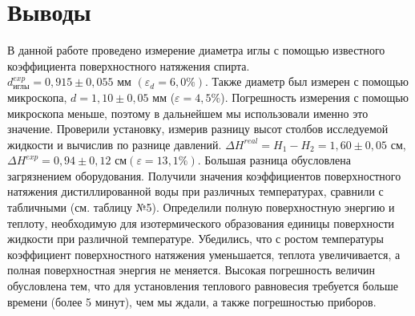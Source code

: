 \documentclass[a4paper]{article}
\begin{document}
\section{Выводы}
В данной работе проведено измерение диаметра иглы с помощью известного коэффициента поверхностного натяжения спирта. $d_{\text{иглы}}^{exp} =0,915 \pm 0,055 \text{ мм }(\varepsilon_{d} = 6,0\%)$. Также диаметр был измерен с помощью микроскопа, $d = 1,10 \pm 0,05 \text{ мм}$ ($\varepsilon = 4,5\%$). Погрешность измерения с помощью микроскопа меньше, поэтому в дальнейшем мы использовали именно это значение.
Проверили установку, измерив разницу высот столбов исследуемой жидкости и вычислив по разнице давлений. $\Delta H^{real} = H_1 - H_2 = 1,60 \pm 0,05 \text{ см}$, $\Delta H^{exp} =  0,94 \pm 0,12 \text{ см}(\varepsilon = 13,1 \%)$. Большая разница обусловлена загрязнением оборудования.
Получили значения коэффициентов поверхностного натяжения дистиллированной воды при различных температурах, сравнили с табличными (см. таблицу №5).
Определили полную поверхностную энергию и теплоту, необходимую для изотермического образования единицы поверхности жидкости  при различной температуре. Убедились, что с ростом температуры коэффициент поверхностного натяжения уменьшается, теплота увеличивается, а полная поверхностная энергия не меняется. Высокая погрешность величин обусловлена тем, что для установления теплового равновесия требуется больше времени (более 5 минут), чем мы ждали, а также погрешностью приборов. 
\end{document}
